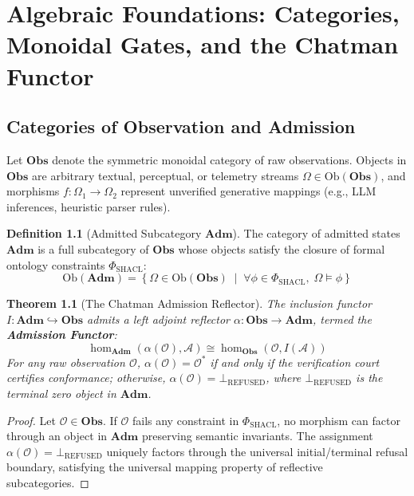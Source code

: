 \documentclass[12pt,oneside,a4paper]{book}
\theoremstyle{definition}
\newtheorem{definition}{Definition}[chapter]
\theoremstyle{plain}
\newtheorem{theorem}{Theorem}[chapter]
\theoremstyle{remark}
\begin{document}
\chapter{Algebraic Foundations: Categories, Monoidal Gates, and the Chatman Functor}

\section{Categories of Observation and Admission}
Let $\mathbf{Obs}$ denote the symmetric monoidal category of raw observations. Objects in $\mathbf{Obs}$ are arbitrary textual, perceptual, or telemetry streams $\Omega \in \text{Ob}(\mathbf{Obs})$, and morphisms $f: \Omega_1 \to \Omega_2$ represent unverified generative mappings (e.g., LLM inferences, heuristic parser rules).

\begin{definition}[Admitted Subcategory $\mathbf{Adm}$]
The category of admitted states $\mathbf{Adm}$ is a full subcategory of $\mathbf{Obs}$ whose objects satisfy the closure of formal ontology constraints $\Phi_{\text{SHACL}}$:
\begin{equation}
    \text{Ob}(\mathbf{Adm}) = \left\{ \Omega \in \text{Ob}(\mathbf{Obs}) \;\middle|\; \forall \phi \in \Phi_{\text{SHACL}}, \; \Omega \models \phi \right\}
\end{equation}
\end{definition}

\begin{theorem}[The Chatman Admission Reflector]
The inclusion functor $I: \mathbf{Adm} \hookrightarrow \mathbf{Obs}$ admits a left adjoint reflector $\alpha: \mathbf{Obs} \to \mathbf{Adm}$, termed the \textbf{Admission Functor}:
\begin{equation}
    \hom_{\mathbf{Adm}}(\alpha(\mathcal{O}), \mathcal{A}) \cong \hom_{\mathbf{Obs}}(\mathcal{O}, I(\mathcal{A}))
\end{equation}
For any raw observation $\mathcal{O}$, $\alpha(\mathcal{O}) = \mathcal{O}^*$ if and only if the verification court certifies conformance; otherwise, $\alpha(\mathcal{O}) = \bot_{\text{REFUSED}}$, where $\bot_{\text{REFUSED}}$ is the terminal zero object in $\mathbf{Adm}$.
\end{theorem}

\begin{proof}
Let $\mathcal{O} \in \mathbf{Obs}$. If $\mathcal{O}$ fails any constraint in $\Phi_{\text{SHACL}}$, no morphism can factor through an object in $\mathbf{Adm}$ preserving semantic invariants. The assignment $\alpha(\mathcal{O}) = \bot_{\text{REFUSED}}$ uniquely factors through the universal initial/terminal refusal boundary, satisfying the universal mapping property of reflective subcategories.
\end{proof}
\end{document}
